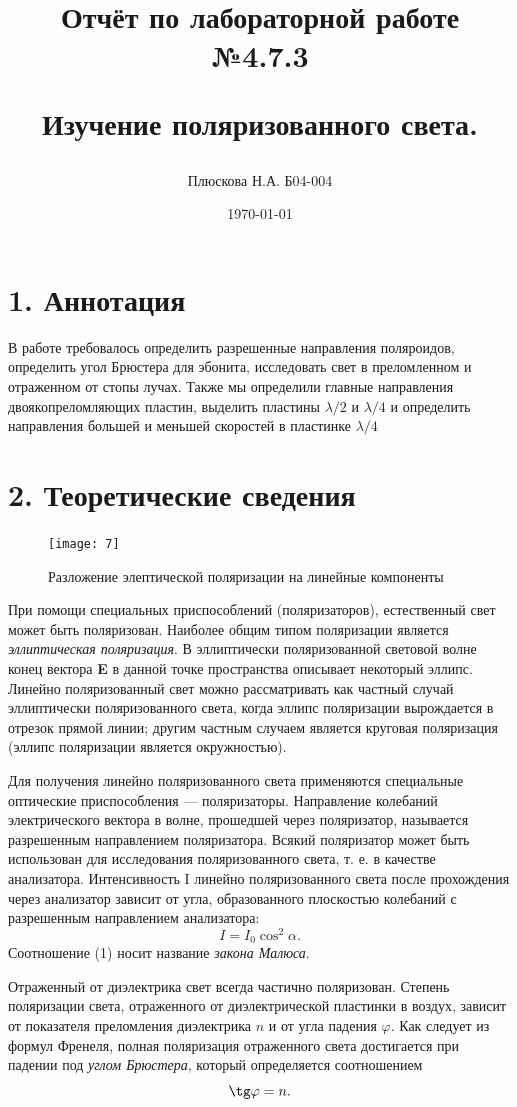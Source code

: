 \documentclass[a4paper,12pt]{report}
\title{Отчёт по лабораторной работе №4.7.3 

Изучение поляризованного света.}
\author{Плюскова Н.А. Б04-004 }
\date{\today}
\begin{document}
\maketitle

\section*{1. Аннотация}

В работе требовалось определить разрешенные направления поляроидов, определить угол Брюстера для эбонита, исследовать свет в преломленном и отраженном от стопы лучах. Также мы определили главные направления двоякопреломляющих пластин, выделить пластины $\lambda/2$ и $\lambda/4$ и определить направления большей и меньшей скоростей в пластинке $\lambda/4$

\section*{2. Теоретические сведения}
\begin{figure} 
	\texttt{[image: 7]}
	\caption{Разложение элептической поляризации на линейные компоненты}
	\label{ris 1}
\end{figure}
При помощи специальных приспособлений (поляризаторов), естественный свет может быть поляризован. Наиболее общим типом поляризации является \textit{эллиптическая поляризация}. В эллиптически поляризованной световой волне конец вектора \textbf{E} в данной точке пространства описывает некоторый эллипс. Линейно поляризованный свет можно рассматривать как частный случай эллиптически поляризованного света, когда эллипс поляризации вырождается в отрезок прямой линии; другим частным случаем является круговая
поляризация (эллипс поляризации является окружностью). \par
Для получения линейно поляризованного света применяются специальные оптические приспособления — поляризаторы. Направление колебаний электрического вектора в волне, прошедшей через поляризатор, называется
разрешенным направлением поляризатора. Всякий поляризатор может быть использован для исследования поляризованного света, т. е. в качестве анализатора. Интенсивность I линейно поляризованного света после прохождения через анализатор зависит от угла, образованного плоскостью колебаний с разрешенным направлением анализатора:
\begin{equation}
    I = I_0 \cos^2\alpha.  
\end{equation}
Соотношение (1) носит название \textit{закона Малюса}. \par
Отраженный от диэлектрика свет всегда частично поляризован. Степень поляризации света, отраженного от диэлектрической пластинки в воздух, зависит от показателя преломления диэлектрика $n$ и от угла падения $\varphi$. Как следует из формул Френеля, полная поляризация отраженного света достигается
при падении под \textit{углом Брюстера}, который определяется соотношением
\begin{equation}
    \tg \varphi = n.   
\end{equation}
\end{document}
